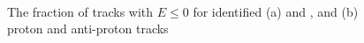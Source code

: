 \begin{figure}[h]
\centering
{}
~
\caption{ The fraction of tracks with $E \leq 0$ for identified (a) \pip and \pim, and (b) proton and anti-proton tracks}
\label{fig:identified_zero_fraction}
\end{figure}


